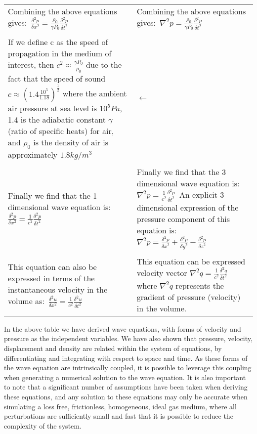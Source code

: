 \begin{center}
\begin{longtable}{|p{}|p{}|}
\\
Combining the above equations gives:\ $\frac{\delta^2 p}{\delta x^2}=\frac{\rho_0}{\gamma P_0}\frac{\delta^2 p}{\delta t^2} $ & Combining the above equations gives:\ $\nabla^2 p = \frac{\rho_0}{\gamma P_0}\frac{\delta^2 p}{\delta t^2}$ \\
\\
If we define c as the speed of propagation in the medium of interest, then $c^2\approx \frac{\gamma P_0}{\rho_0}$ due to the fact that the speed of sound $c \approx (1.4\frac{10^5}{1.18})^\frac{1}{2}$ where the ambient air pressure at sea level is $10^5Pa$, 1.4 is the adiabatic constant $\gamma$ (ratio of specific heats) for air, and $\rho_0$ is the density of air is approximately $1.8kg/m^3 $   & $\leftarrow$ \\
\\
Finally we find that the 1 dimensional wave equation is:\ $\frac{\delta^2 p}{\delta x^2}=\frac{1}{c^2}\frac{\delta^2 p}{\delta t^2}$ & Finally we find that the 3 dimensional wave equation is:\ $\nabla^2 p = \frac{1}{c^2}\frac{\delta^2 p}{\delta t^2}$\ An explicit 3 dimensional expression of the pressure component of this equation is:\ $\nabla^2 p = \frac{\delta^2p}{\delta x^2}+\frac{\delta^2p}{\delta y^2}+\frac{\delta^2p}{\delta z^2}$ \\
\\
This equation can also be expressed in terms of the instantaneous velocity in the volume as:\ $\frac{\delta^2 u}{\delta x^2}=\frac{1}{c^2}\frac{\delta^2 u}{\delta t^2}$ & This equation can be expressed velocity vector $\nabla^2 q = \frac{1}{c^2}\frac{\delta^2 q}{\delta t^2}$ where $\nabla^2 q$ represents the gradient of pressure (velocity) in the volume.\\
\hline
\end{longtable}
\end{center}

In the above table we have derived wave equations, with forms of velocity and pressure as the independent variables. We have also shown that pressure, velocity, displacement and density are related within the system of equations, by differentiating and integrating with respect to space and time. As these forms of the wave equation are intrinsically coupled, it is possible to leverage this coupling when generating a numerical solution to the wave equation. It is also important to note that a significant number of assumptions have been taken when deriving these equations, and any solution to these equations may only be accurate when simulating a loss free, frictionless, homogeneous, ideal gas medium, where all perturbations are sufficiently small and fast that it is possible to reduce the complexity of the system.\\

